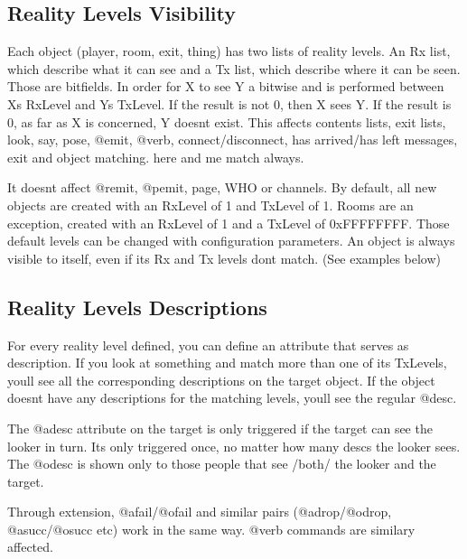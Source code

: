 \documentclass[letterpaper,10pt,english]{sphinxmanual}
\begin{document}
\subsection{Reality Levels Visibility}
\label{\detokenize{advanced:reality-levels-visibility}}
\sphinxAtStartPar
Each object (player, room, exit, thing) has two lists of reality levels.
An Rx list, which describe what it can see and a Tx list, which describe
where it can be seen. Those are bitfields. In order for X to see Y a bitwise
\textquotesingle{}and\textquotesingle{} is performed between X\textquotesingle{}s RxLevel and Y\textquotesingle{}s TxLevel. If the result is not
0, then X sees Y. If the result is 0, as far as X is concerned, Y doesn\textquotesingle{}t
exist. This affects contents lists, exit lists, look, say, pose, @emit,
@verb, connect/disconnect, has arrived/has left messages, exit and object
matching. \textquotesingle{}here\textquotesingle{} and \textquotesingle{}me\textquotesingle{} match always.

\sphinxAtStartPar
It doesn\textquotesingle{}t affect @remit, @pemit, page, WHO or channels.
By default, all new objects are created with an RxLevel of 1 and TxLevel of
1. Rooms are an exception, created with an RxLevel of 1 and a TxLevel of
0xFFFFFFFF. Those default levels can be changed with configuration
parameters.
An object is always visible to itself, even if its Rx and Tx levels don\textquotesingle{}t
match. (See examples below)


\subsection{Reality Levels Descriptions}
\label{\detokenize{advanced:reality-levels-descriptions}}
\sphinxAtStartPar
For every reality level defined, you can define an attribute that serves as
description. If you look at something and match more than one of its
TxLevels, you\textquotesingle{}ll see all the corresponding descriptions on the target
object. If the object doesn\textquotesingle{}t have any descriptions for the matching levels,
you\textquotesingle{}ll see the regular @desc.

\sphinxAtStartPar
The @adesc attribute on the target is only triggered if the target can see
the looker in turn. It\textquotesingle{}s only triggered once, no matter how many descs the
looker sees. The @odesc is shown only to those people that see /both/ the
looker and the target.

\sphinxAtStartPar
Through extension, @afail/@ofail and similar pairs (@adrop/@odrop,
@asucc/@osucc etc) work in the same way. @verb commands are similary
affected.
\end{document}
